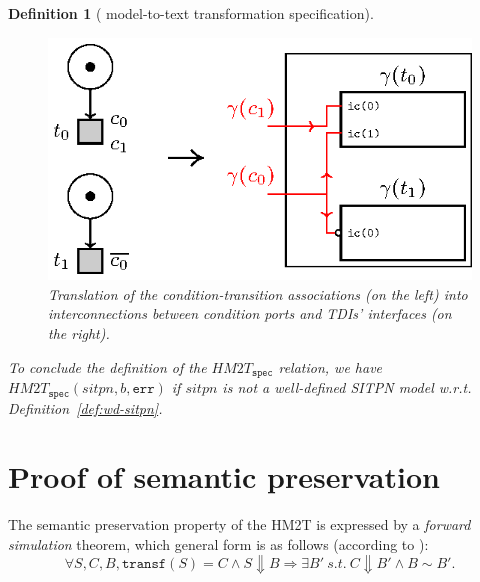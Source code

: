 \documentclass[pdflatex,sn-mathphys]{sn-jnl}%
\theoremstyle{thmstyleone}%
\theoremstyle{thmstyletwo}%
\theoremstyle{thmstylethree}%
\newtheorem{definition}{Definition}%
\begin{document}
\begin{definition}[\hilecop{} model-to-text transformation specification]
  \begin{figure}[h]
    \centering
    \includegraphics[keepaspectratio,width=.65\textwidth]{gen-conds.eps}
    \caption{Translation of the condition-transition associations (on
      the left) into interconnections between condition ports and
      TDIs' interfaces (on the right). }
    \label{fig:gen-conds}
  \end{figure}

  To conclude the definition of the $HM2T_{\mathtt{spec}}$ relation,
  we have $HM2T_{\mathtt{spec}}(sitpn,b,\mathtt{err})$ if $sitpn$ is
  not a well-defined SITPN model w.r.t. Definition~\ref{def:wd-sitpn}.
\end{definition}

\section{Proof of semantic preservation}
\label{sec:proof}

The semantic preservation property of the HM2T is expressed by a
\textit{forward simulation} theorem, which general form is as follows
(according to \cite{Leroy2009}):
\begin{equation*}
  \forall{}S,C,B,\mathtt{transf}(S)=C\land{}S\Downarrow{}B\Rightarrow{}\exists{}B'~s.t.~C\Downarrow{}B'\land{}B\sim{}B'.
\end{equation*}
\end{document}
